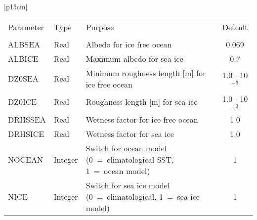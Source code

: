 \begin{center}
\begin{tabular}{|p{15cm}|}
\vspace{1mm} 

\begin{center}
\begin{tabular}{l l p{5cm} c}  %
Parameter & Type & Purpose & Default \\
&&&\\
ALBSEA & Real & Albedo for ice free ocean & 0.069 \\
ALBICE & Real & Maximum albedo for sea ice & 0.7 \\
DZ0SEA & Real & Minimum roughness length [m] for ice free ocean & 1.0 $\cdot$
10$^{-5}$
\\
DZ0ICE & Real & Roughness length [m] for sea ice & 1.0 $\cdot$ 10$^{-3}$ \\
DRHSSEA& Real & Wetness factor for ice free ocean & 1.0 \\
DRHSICE& Real & Wetness factor for sea ice & 1.0 \\
NOCEAN & Integer & Switch for ocean model (0~=~climatological SST, 1~=~ocean model)
& 1 \\
NICE & Integer & Switch for sea ice model (0~=~climatological, 1~=~sea ice model) & 1 \\
\end{tabular}
\end{center}
\vspace{3mm} \\
\hline
\end{tabular}
\end{center}

\newpage 


